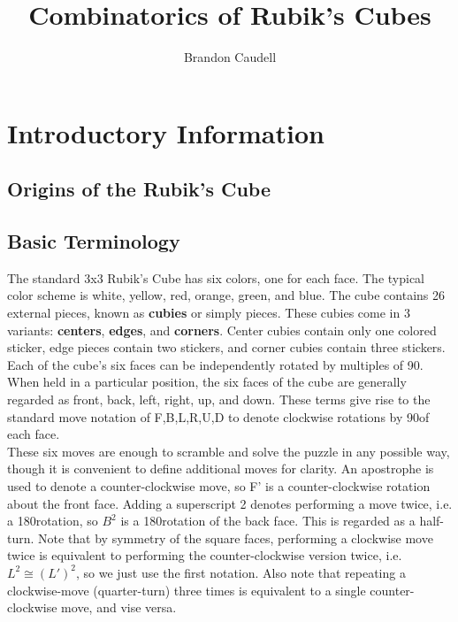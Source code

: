 \documentclass[10pt,letterpaper]{report}
\author{Brandon Caudell}
\title{Combinatorics of Rubik's Cubes}
\begin{document}
\maketitle
\newpage 
\tableofcontents
\newpage 
\chapter{Introductory Information}
\section{Origins of the Rubik's Cube}
\section{Basic Terminology}
The standard 3x3 Rubik's Cube has six colors, one for each face.  The typical color scheme is white, yellow, red, orange, green, and blue.  The cube contains 26 external pieces, known as \textbf{cubies} or simply pieces.  These cubies come in 3 variants: \textbf{centers}, \textbf{edges}, and \textbf{corners}.  Center cubies contain only one colored sticker, edge pieces contain two stickers, and corner cubies contain three stickers.\\

Each of the cube's six faces can be independently rotated by multiples of 90\textdegree.  When held in a particular position, the six faces of the cube are generally regarded as front, back, left, right, up, and down.  These terms give rise to the standard move notation of F,B,L,R,U,D to denote clockwise rotations by 90\textdegree of each face.\\

These six moves are enough to scramble and solve the puzzle in any possible way, though it is convenient to define additional moves for clarity.  An apostrophe is used to denote a counter-clockwise move, so F' is a counter-clockwise rotation about the front face.  Adding a superscript 2 denotes performing a move twice, i.e. a 180\textdegree rotation, so $B^2$ is a 180\textdegree rotation of the back face.  This is regarded as a half-turn.  Note that by symmetry of the square faces, performing a clockwise move twice is equivalent to performing the counter-clockwise version twice, i.e. $L^2 \cong (L')^2$, so we just use the first notation.  Also note that repeating a clockwise-move (quarter-turn) three times is equivalent to a single counter-clockwise move, and vise versa.\\
\end{document}
